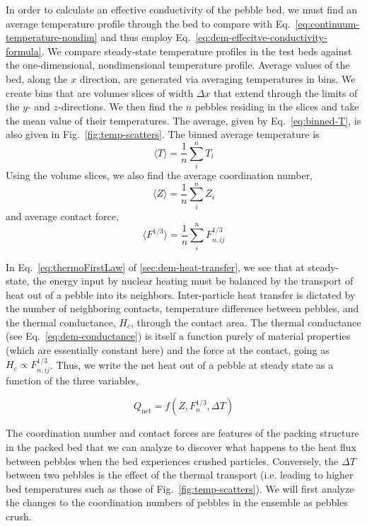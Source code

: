 In order to calculate an effective conductivity of the pebble bed, we must find an average temperature profile through the bed to compare with Eq.~\ref{eq:continuum-temperature-nondim} and thus employ Eq.~\ref{eq:dem-effecitve-conductivity-formula}. We compare steady-state temperature profiles in the test beds against the one-dimensional, nondimensional temperature profile. Average values of the bed, along the $x$ direction, are generated via averaging temperatures in bins. We create bins that are volumes slices of width $\Delta x$ that extend through the limits of the $y$- and $z$-directions. We then find the $n$ pebbles residing in the slices and take the mean value of their temperatures. The average, given by Eq.~\ref{eq:binned-T}, is also given in Fig.~\ref{fig:temp-scatters}. The binned average temperature is 
\begin{equation}\label{eq:binned-T}
	\langle T\rangle = \frac{1}{n}\sum_{i}^n T_i 	
\end{equation}
Using the volume slices, we also find the average coordination number, 
\begin{equation}\label{eq:binned-z}
	\langle Z \rangle = \frac{1}{n}\sum_{i}^n Z_i
\end{equation}
and average contact force, 
\begin{equation}\label{eq:binned-f}
	\langle F^{1/3} \rangle = \frac{1}{n}\sum_{i}^n F_{n,ij}^{1/3}
\end{equation}


In Eq.~\ref{eq:thermoFirstLaw} of \cref{sec:dem-heat-transfer}, we see that at steady-state, the energy input by nuclear heating must be balanced by the transport of heat out of a pebble into its neighbors. Inter-particle heat transfer is dictated by the number of neighboring contacts, temperature difference between pebbles, and the thermal conductance, $H_{c}$, through the contact area. The thermal conductance (see Eq.~\ref{eq:dem-conductance}) is itself a function purely of material properties  (which are essentially constant here) and the force at the contact, going as $H_{c} \propto F_{n,ij}^{1/3}$. Thus, we write the net heat out of a pebble at steady state as a function of the three variables,

\begin{equation}
	Q_\text{net} =f( Z, F_n^{1/3}, \Delta T)
\end{equation}

The coordination number and contact forces are features of the packing structure in the packed bed that we can analyze to discover what happens to the heat flux between pebbles when the bed experiences crushed particles. Conversely, the $\Delta T$ between two pebbles is the effect of the thermal transport (i.e. leading to higher bed temperatures such as those of Fig.~\ref{fig:temp-scatters}). We will first analyze the changes to the coordination numbers of pebbles in the ensemble as pebbles crush.


